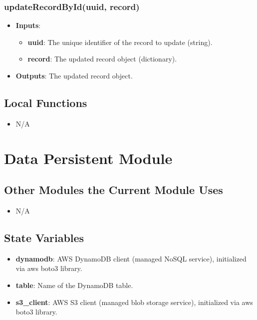 \documentclass[12pt, titlepage]{article}
\begin{document}
\subsubsection{updateRecordById(uuid, record)}
\begin{itemize}
    \item \textbf{Inputs}:
        \begin{itemize}
            \item \textbf{uuid}: The unique identifier of the record to update (string).
            \item \textbf{record}: The updated record object (dictionary).
        \end{itemize}
    \item \textbf{Outputs}: The updated record object.
\end{itemize}

\subsection{Local Functions}
\begin{itemize}
\item N/A
\end{itemize}

\newpage
\section{Data Persistent Module}
\label{Data Persistence Module}

\subsection{Other Modules the Current Module Uses}
\begin{itemize}
    \item N/A
\end{itemize}

\subsection{State Variables}
\begin{itemize}
    \item \textbf{dynamodb}: AWS DynamoDB client (managed NoSQL service), initialized via aws boto3 library.
    \item \textbf{table}: Name of the DynamoDB table.
    \item \textbf{s3\_client}: AWS S3 client (managed blob storage service), initialized via aws boto3 library.
\end{itemize}
\end{document}
